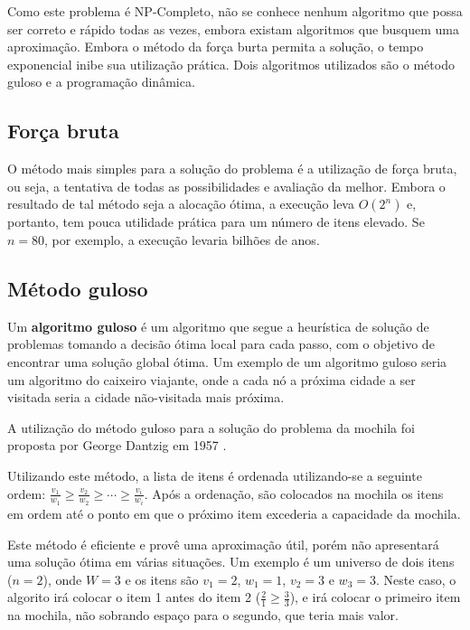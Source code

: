 \documentclass[a4paper,twocolumn]{article}
\begin{document}
Como este problema é NP-Completo, não se conhece nenhum algoritmo que possa ser correto e rápido todas as vezes, embora existam algoritmos que busquem uma aproximação. Embora o método da força burta permita a solução, o tempo exponencial inibe sua utilização prática. Dois algoritmos utilizados são o método guloso e a programação dinâmica.


\subsection{Força bruta}

O método mais simples para a solução do problema é a utilização de força bruta, ou seja, a tentativa de todas as possibilidades e avaliação da melhor. Embora o resultado de tal método seja a alocação ótima, a execução leva $O(2^n)$ e, portanto, tem pouca utilidade prática para um número de itens elevado. Se $n=80$, por exemplo, a execução levaria bilhões de anos.


\subsection{Método guloso}

Um \textbf{algoritmo guloso} é um algoritmo que segue a heurística de solução de problemas tomando a decisão ótima local para cada passo, com o objetivo de encontrar uma solução global ótima. Um exemplo de um algoritmo guloso seria um algoritmo do caixeiro viajante, onde a cada nó a próxima cidade a ser visitada seria a cidade não-visitada mais próxima.

A utilização do método guloso para a solução do problema da mochila foi proposta por George Dantzig em 1957 \cite{dant57}.

Utilizando este método, a lista de itens é ordenada utilizando-se a seguinte ordem: $\frac{v_1}{w_1}\geq\frac{v_2}{w_2}\geq\cdots\geq\frac{v_i}{w_i}$. Após a ordenação, são colocados na mochila os itens em ordem até o ponto em que o próximo item excederia a capacidade da mochila.

Este método é eficiente e provê uma aproximação útil, porém não apresentará uma solução ótima em várias situações. Um exemplo é um universo de dois itens ($n=2$), onde $W=3$ e os itens são $v_1=2$, $w_1=1$, $v_2=3$ e $w_3=3$. Neste caso, o algorito irá colocar o item 1 antes do item 2 ($\frac{2}{1}\geq\frac{3}{3}$), e irá colocar o primeiro item na mochila, não sobrando espaço para o segundo, que teria mais valor.
\end{document}
